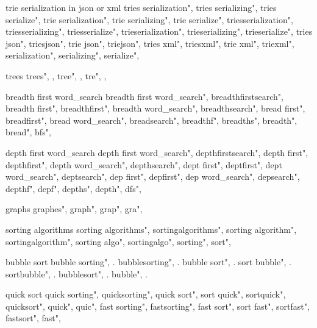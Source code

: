          trie serialization in json or xml 
        tries serialization",  
        tries serializing",  
        tries serialize",  
        trie serialization",  
        trie serializing",  
        trie serialize",  
        triesserialization",  
        triesserializing",  
        triesserialize",  
        trieserialization",  
        trieserializing",  
        trieserialize",  
        tries json",  
        triesjson",  
        trie json",  
        triejson",  
        tries xml",  
        triesxml",  
        trie xml",  
        triexml",  
        serialization",  
        serializing",  
        serialize",  
        
         trees 
        trees", , 
        tree", , 
        tre", , 
        
         breadth first word_search 
        breadth first word_search",  
        breadthfirstsearch",  
        breadth first",  
        breadthfirst",  
        breadth word_search",  
        breadthsearch",  
        bread first",  
        breadfirst",  
        bread word_search",  
        breadsearch",  
        breadthf",  
        breadths",  
        breadth",  
        bread",  
        bfs",  
        
         depth first word_search 
        depth first word_search",  
        depthfirstsearch",  
        depth first",  
        depthfirst",  
        depth word_search",  
        depthsearch",  
        dept first",  
        deptfirst",  
        dept word_search",  
        deptsearch",  
        dep first",  
        depfirst",  
        dep word_search",  
        depsearch",  
        depthf",  
        depf",  
        depths",  
        depth",  
        dfs",  
        
         graphs 
        graphes", 
        graph", 
        grap", 
        gra", 
        
         sorting algorithms 
        sorting algorithms",  
        sortingalgorithms",  
        sorting algorithm",  
        sortingalgorithm",  
        sorting algo",  
        sortingalgo",  
        sorting",  
        sort",  
        
         bubble sort 
        bubble sorting", . 
        bubblesorting", . 
        bubble sort", . 
        sort bubble", . 
        sortbubble", . 
        bubblesort", . 
        bubble", . 
        
         quick sort 
        quick sorting",  
        quicksorting",  
        quick sort",  
        sort quick",  
        sortquick",  
        quicksort",  
        quick",  
        quic",  
        fast sorting",  
        fastsorting",  
        fast sort",  
        sort fast",  
        sortfast",  
        fastsort",  
        fast",  
        
